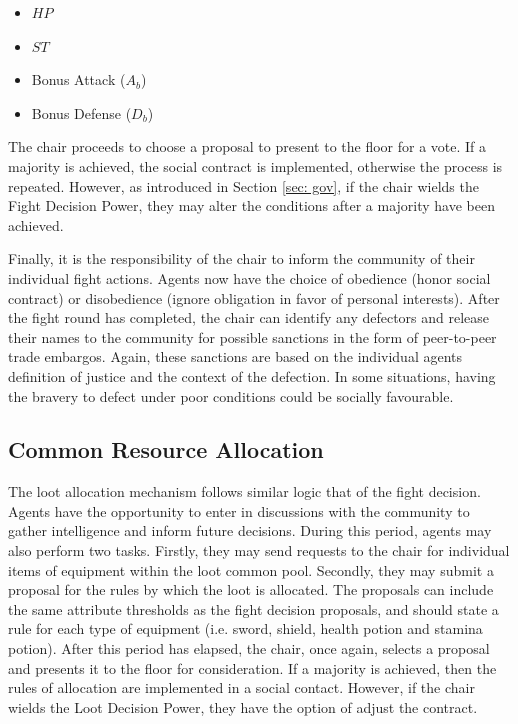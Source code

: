 \begin{itemize}
    \item $HP$
    \item $ST$
    \item Bonus Attack ($A_b$)
    \item Bonus Defense ($D_b$)
\end{itemize}

The chair proceeds to choose a proposal to present to the floor for a vote. If a majority is achieved, the social contract is implemented, otherwise the process is repeated. However, as introduced in Section \ref{sec: gov}, if the chair wields the Fight Decision Power, they may alter the conditions after a majority have been achieved. 

Finally, it is the responsibility of the chair to inform the community of their individual fight actions. Agents now have the choice of obedience (honor social contract) or disobedience (ignore obligation in favor of personal interests). After the fight round has completed, the chair can identify any defectors and release their names to the community for possible sanctions in the form of peer-to-peer trade embargos. Again, these sanctions are based on the individual agents definition of justice and the context of the defection. In some situations, having the bravery to defect under poor conditions could be socially favourable. 

\subsection{Common Resource Allocation}\label{sec: cmr}

% 
The loot allocation mechanism follows similar logic that of the fight decision. Agents have the opportunity to enter in discussions with the community to gather intelligence and inform future decisions. During this period, agents may also perform two tasks. Firstly, they may send requests to the chair for individual items of equipment within the loot common pool. Secondly, they may submit a proposal for the rules by which the loot is allocated. The proposals can include the same attribute thresholds as the fight decision proposals, and should state a rule for each type of equipment (i.e. sword, shield, health potion and stamina potion). After this period has elapsed, the chair, once again, selects a proposal and presents it to the floor for consideration. If a majority is achieved, then the rules of allocation are implemented in a social contact. However, if the chair wields the Loot Decision Power, they have the option of adjust the contract. 

